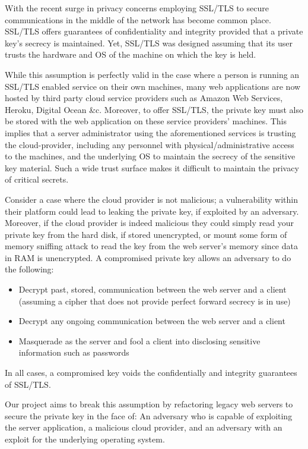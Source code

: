 \documentclass[../main.tex]{subfiles}
\begin{document}
With the recent surge in privacy concerns employing SSL/TLS to secure communications in the middle of the network has become common place. 
SSL/TLS offers guarantees of confidentiality and integrity provided that a private key's secrecy is maintained. Yet, SSL/TLS was designed 
assuming that its user trusts the hardware and OS of the machine on which the key is held. 

While this assumption is perfectly valid in the case where a person is running an SSL/TLS enabled service on their own machines, many web
applications are now hosted by third party cloud service providers such as Amazon Web Services, Heroku, Digital Ocean \&c. Moreover, to offer 
SSL/TLS, the private key must also be stored with the web application on these service providers' machines. This implies that a server administrator 
using the aforementioned services is trusting the cloud-provider, including any personnel with physical/administrative access to the machines, and the underlying OS
to maintain the secrecy of the sensitive key material. Such a wide trust surface makes it difficult to maintain the privacy of critical secrets.

Consider a case where the cloud provider is not malicious; a vulnerability within their platform could lead to leaking the private key,
if exploited by an adversary. Moreover, if the cloud provider is indeed malicious they could simply read your private key from the hard disk, if stored 
unencrypted, or mount some form of memory sniffing attack to read the key from the web server's memory since data in RAM is unencrypted. A compromised private 
key allows an adversary to do the following:
\begin{itemize}
	\item Decrypt past, stored, communication between the web server and a client (assuming a cipher that does not provide perfect forward secrecy is in use)
	\item Decrypt any ongoing communication between the web server and a client
	\item Masquerade as the server and fool a client into disclosing sensitive information such as passwords
\end{itemize}
In all cases, a compromised key voids the confidentially and integrity guarantees of SSL/TLS. 

Our project aims to break this assumption by refactoring legacy web servers to secure the private key in the face of: An adversary who is capable of exploiting the server application, 
a malicious cloud provider, and an adversary with an exploit for the underlying operating system. 
\end{document}
